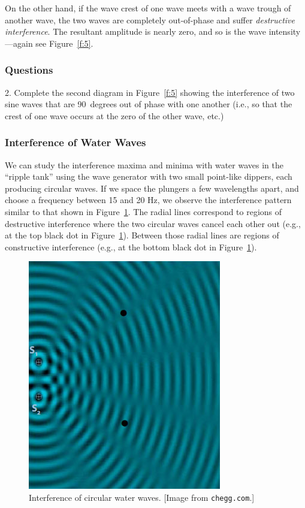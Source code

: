 \documentclass[11pt]{NSF}
\begin{document}
On the other hand, if the wave crest of one wave meets with a wave trough of
another wave, the two waves are completely out-of-phase and suffer 
{\em destructive interference}. The resultant amplitude is nearly zero, and so is the wave
intensity---again see Figure~\ref{f:5}.

\subsubsection*{Questions}

2.	 Complete the second diagram in Figure~\ref{f:5} 
showing the interference of two sine waves that are 90~degrees
out of phase with one another 
(i.e., so that the crest of one wave occurs at the zero of the other wave, etc.)


\subsubsection{Interference of Water Waves}

We can study the interference maxima and minima with water waves in the 
``ripple tank” using the wave generator with two small point-like dippers, 
each producing circular waves. 
If we space the plungers a few wavelengths apart, and choose a 
frequency between 15 and 20 Hz, we observe the interference pattern
similar to that shown in Figure~\ref{f:6}.
The radial lines correspond to regions of destructive interference
where the two circular waves cancel each other out (e.g., at the top 
black dot in Figure~\ref{f:6}).
Between those radial lines are regions of constructive interference
(e.g., at the bottom black dot in Figure~\ref{f:6}).
%
\begin{figure}[hbtp]
\begin{center}
\includegraphics[width=.5\textwidth]{fig2_6}
\caption{Interference of circular water waves.
[Image from {\tt chegg.com}.]}
\label{f:6}
\end{center}
\end{figure}
%
\end{document}

